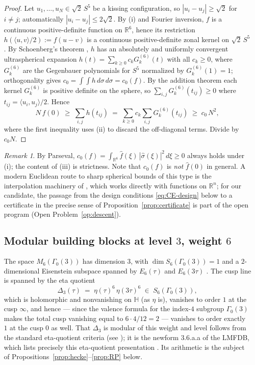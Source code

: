 \documentclass[11pt,reqno]{amsart}
\theoremstyle{plain}
\theoremstyle{definition}
\theoremstyle{remark}
\newtheorem{remark}[theorem]{Remark}
\newcommand{\R}{\mathbb{R}}
\newcommand{\HH}{\mathbb{H}}
\newcommand{\Dthree}{\Delta_{3}}
\newcommand{\fhat}[1]{\widehat{#1}}
\begin{document}
\begin{proof}
Let $u_1,\dots,u_N\in\sqrt2\,S^5$ be a kissing configuration, so
$|u_i-u_j|\ge\sqrt2$ for $i\ne j$; automatically
$|u_i-u_j|\le2\sqrt2$.  By (i) and Fourier inversion, $f$ is a
continuous positive-definite function on $\R^6$, hence its restriction
$h(\langle u,v\rangle/2):=f(u-v)$ is a continuous positive-definite
zonal kernel on $\sqrt2\,S^5$.  By Schoenberg's theorem
\cite{Schoenberg1942}, $h$ has an absolutely and uniformly convergent
ultraspherical expansion $h(t)=\sum_{k\ge0}c_kG_k^{(6)}(t)$ with all
$c_k\ge0$, where $G_k^{(6)}$ are the Gegenbauer polynomials for $S^5$
normalized by $G_k^{(6)}(1)=1$; orthogonality gives
$c_0=\int\!\!\int h\,d\sigma\,d\sigma=c_0(f)$.  By the addition
theorem each kernel $G_k^{(6)}$ is positive definite on the sphere, so
$\sum_{i,j}G_k^{(6)}(t_{ij})\ge0$ where $t_{ij}=\langle
u_i,u_j\rangle/2$.  Hence
\[
N\,f(0)\;\ge\;\sum_{i,j}h(t_{ij})
\;=\;\sum_{k\ge0}c_k\sum_{i,j}G_k^{(6)}(t_{ij})
\;\ge\;c_0\,N^2 ,
\]
where the first inequality uses (ii) to discard the off-diagonal
terms.  Divide by $c_0N$.
\end{proof}

\begin{remark}\label{rem:c0}
By Parseval, $c_0(f)=\int_{\R^6}\fhat f(\xi)\,
|\widehat{\sigma}(\xi)|^2\,d\xi\ge0$ always holds under (i); the
content of (iii) is strictness.  Note that $c_0(f)$ is \emph{not}
$\fhat f(0)$ in general.  A modern Euclidean route to sharp spherical
bounds of this type is the interpolation machinery of
\cite{CKMRV2022}, which works directly with functions on $\R^n$; for
our candidate, the passage from the design conditions
\eqref{eq:CE-design} below to a certificate in the precise sense of
Proposition~\ref{prop:certificate} is part of the open program
(Open Problem~\ref{op:descent}).
\end{remark}

\subsection{Modular building blocks at level
\texorpdfstring{$3$}{3}, weight \texorpdfstring{$6$}{6}}
\label{subsec:blocks}

The space $M_6(\Gamma_0(3))$ has dimension $3$, with
$\dim S_6(\Gamma_0(3))=1$ and a $2$-dimensional Eisenstein subspace
spanned by $E_6(\tau)$ and $E_6(3\tau)$
\cite{DiamondShurman2005,LMFDB}.  The cusp line is spanned by the eta
quotient
\[
\Dthree(\tau)\;=\;\eta(\tau)^6\,\eta(3\tau)^6\;\in\;S_6(\Gamma_0(3)),
\]
which is holomorphic and nonvanishing on $\HH$ (as $\eta$ is), vanishes
to order $1$ at the cusp $\infty$, and hence --- since the valence
formula for the index-$4$ subgroup $\Gamma_0(3)$ makes the total cusp
vanishing equal to $6\cdot4/12=2$ --- vanishes to order exactly $1$ at
the cusp $0$ as well.  That $\Dthree$ is modular of this weight and
level follows from the standard eta-quotient criteria (see
\cite[\S1.4]{Ono2004}); it is the newform \textsf{3.6.a.a} of the
LMFDB, which lists precisely this eta-quotient presentation
\cite{LMFDB}.  Its arithmetic is the subject of
Propositions~\ref{prop:hecke}--\ref{prop:RP} below.
\end{document}
